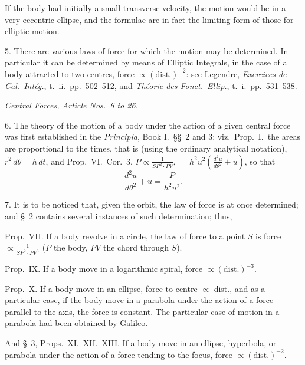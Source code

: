 \documentclass[11pt]{article}
\begin{document}
If the body had initially a small transverse velocity, the motion would be in a very eccentric ellipse, and the formulae are in fact the limiting form of those for elliptic motion.

5. There are various laws of force for which the motion may be determined. In particular it can be determined by means of Elliptic Integrals, in the case of a body attracted to two centres, force $\propto(\text{dist.})^{-2}$: see Legendre, \emph{Exercices de Cal.\ Int\'eg.}, t.\ ii.\ pp.\ 502--512, and \emph{Th\'eorie des Fonct.\ Ellip.}, t.\ i.\ pp.\ 531--538.

\medskip
\begin{center}\textit{Central Forces, Article Nos.\ 6 to 26.}\end{center}

6. The theory of the motion of a body under the action of a given central force was first established in the \emph{Principia}, Book I.\ \S\S\ 2 and 3: viz.\ Prop.\ I.\ the areas are proportional to the times, that is (using the ordinary analytical notation), $r^{2}\,d\theta = h\,dt$, and Prop.\ VI.\ Cor.\ 3, $P\propto\frac{1}{SP^{2}\cdot PV}$, $=h^{2}u^{2}\left(\frac{d^{2}u}{d\theta^{2}}+u\right)$, so that
\[ \frac{d^{2}u}{d\theta^{2}}+u = \frac{P}{h^{2}u^{2}}. \]

7. It is to be noticed that, given the orbit, the law of force is at once determined; and \S\ 2 contains several instances of such determination; thus,

Prop.\ VII. If a body revolve in a circle, the law of force to a point $S$ is force $\propto\frac{1}{SP^{2}\cdot PV^{3}}$ ($P$ the body, $PV$ the chord through $S$).

Prop.\ IX. If a body move in a logarithmic spiral, force $\propto(\text{dist.})^{-3}$.

Prop.\ X. If a body move in an ellipse, force to centre $\propto$ dist., and as a particular case, if the body move in a parabola under the action of a force parallel to the axis, the force is constant. The particular case of motion in a parabola had been obtained by Galileo.

And \S\ 3, Props.\ XI.\ XII.\ XIII. If a body move in an ellipse, hyperbola, or parabola under the action of a force tending to the focus, force $\propto(\text{dist.})^{-2}$.
\end{document}
